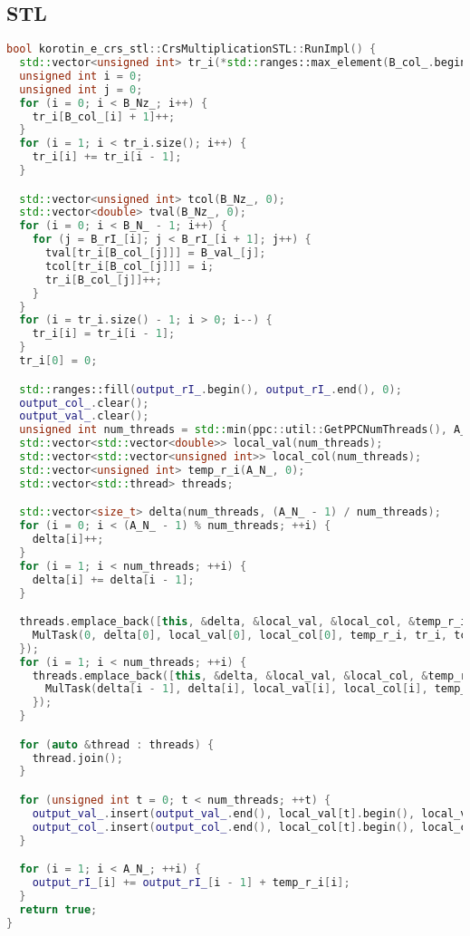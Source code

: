\documentclass[a4paper,12pt]{article}
\begin{document}
\subsection{STL}
\begin{lstlisting}[language=C++]
bool korotin_e_crs_stl::CrsMultiplicationSTL::RunImpl() {
  std::vector<unsigned int> tr_i(*std::ranges::max_element(B_col_.begin(), B_col_.end()) + 2, 0);
  unsigned int i = 0;
  unsigned int j = 0;
  for (i = 0; i < B_Nz_; i++) {
    tr_i[B_col_[i] + 1]++;
  }
  for (i = 1; i < tr_i.size(); i++) {
    tr_i[i] += tr_i[i - 1];
  }

  std::vector<unsigned int> tcol(B_Nz_, 0);
  std::vector<double> tval(B_Nz_, 0);
  for (i = 0; i < B_N_ - 1; i++) {
    for (j = B_rI_[i]; j < B_rI_[i + 1]; j++) {
      tval[tr_i[B_col_[j]]] = B_val_[j];
      tcol[tr_i[B_col_[j]]] = i;
      tr_i[B_col_[j]]++;
    }
  }
  for (i = tr_i.size() - 1; i > 0; i--) {
    tr_i[i] = tr_i[i - 1];
  }
  tr_i[0] = 0;

  std::ranges::fill(output_rI_.begin(), output_rI_.end(), 0);
  output_col_.clear();
  output_val_.clear();
  unsigned int num_threads = std::min(ppc::util::GetPPCNumThreads(), A_N_ - 1);
  std::vector<std::vector<double>> local_val(num_threads);
  std::vector<std::vector<unsigned int>> local_col(num_threads);
  std::vector<unsigned int> temp_r_i(A_N_, 0);
  std::vector<std::thread> threads;

  std::vector<size_t> delta(num_threads, (A_N_ - 1) / num_threads);
  for (i = 0; i < (A_N_ - 1) % num_threads; ++i) {
    delta[i]++;
  }
  for (i = 1; i < num_threads; ++i) {
    delta[i] += delta[i - 1];
  }

  threads.emplace_back([this, &delta, &local_val, &local_col, &temp_r_i, &tr_i, &tcol, &tval] {
    MulTask(0, delta[0], local_val[0], local_col[0], temp_r_i, tr_i, tcol, tval);
  });
  for (i = 1; i < num_threads; ++i) {
    threads.emplace_back([this, &delta, &local_val, &local_col, &temp_r_i, &tr_i, &tcol, &tval, i] {
      MulTask(delta[i - 1], delta[i], local_val[i], local_col[i], temp_r_i, tr_i, tcol, tval);
    });
  }

  for (auto &thread : threads) {
    thread.join();
  }

  for (unsigned int t = 0; t < num_threads; ++t) {
    output_val_.insert(output_val_.end(), local_val[t].begin(), local_val[t].end());
    output_col_.insert(output_col_.end(), local_col[t].begin(), local_col[t].end());
  }

  for (i = 1; i < A_N_; ++i) {
    output_rI_[i] += output_rI_[i - 1] + temp_r_i[i];
  }
  return true;
}


\end{lstlisting}
\end{document}
